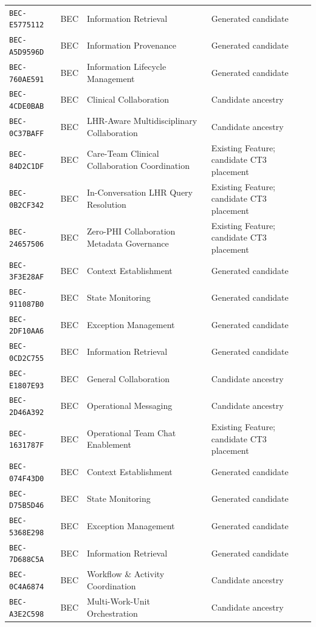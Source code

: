 \documentclass[11pt,a4paper,openany]{book}
\begin{document}
\begin{longtable}{@{}p{.19\linewidth}p{.12\linewidth}p{.39\linewidth}p{.24\linewidth}@{}}
\texttt{BEC-E5775112} & BEC & Information Retrieval & Generated candidate \\
\texttt{BEC-A5D9596D} & BEC & Information Provenance & Generated candidate \\
\texttt{BEC-760AE591} & BEC & Information Lifecycle Management & Generated candidate \\
\texttt{BEC-4CDE0BAB} & BEC & Clinical Collaboration & Candidate ancestry \\
\texttt{BEC-0C37BAFF} & BEC & LHR-Aware Multidisciplinary Collaboration & Candidate ancestry \\
\texttt{BEC-84D2C1DF} & BEC & Care-Team Clinical Collaboration Coordination & Existing Feature; candidate CT3 placement \\
\texttt{BEC-0B2CF342} & BEC & In-Conversation LHR Query Resolution & Existing Feature; candidate CT3 placement \\
\texttt{BEC-24657506} & BEC & Zero-PHI Collaboration Metadata Governance & Existing Feature; candidate CT3 placement \\
\texttt{BEC-3F3E28AF} & BEC & Context Establishment & Generated candidate \\
\texttt{BEC-911087B0} & BEC & State Monitoring & Generated candidate \\
\texttt{BEC-2DF10AA6} & BEC & Exception Management & Generated candidate \\
\texttt{BEC-0CD2C755} & BEC & Information Retrieval & Generated candidate \\
\texttt{BEC-E1807E93} & BEC & General Collaboration & Candidate ancestry \\
\texttt{BEC-2D46A392} & BEC & Operational Messaging & Candidate ancestry \\
\texttt{BEC-1631787F} & BEC & Operational Team Chat Enablement & Existing Feature; candidate CT3 placement \\
\texttt{BEC-074F43D0} & BEC & Context Establishment & Generated candidate \\
\texttt{BEC-D75B5D46} & BEC & State Monitoring & Generated candidate \\
\texttt{BEC-5368E298} & BEC & Exception Management & Generated candidate \\
\texttt{BEC-7D688C5A} & BEC & Information Retrieval & Generated candidate \\
\texttt{BEC-0C4A6874} & BEC & Workflow \& Activity Coordination & Candidate ancestry \\
\texttt{BEC-A3E2C598} & BEC & Multi-Work-Unit Orchestration & Candidate ancestry \\

\end{longtable}
\end{document}
